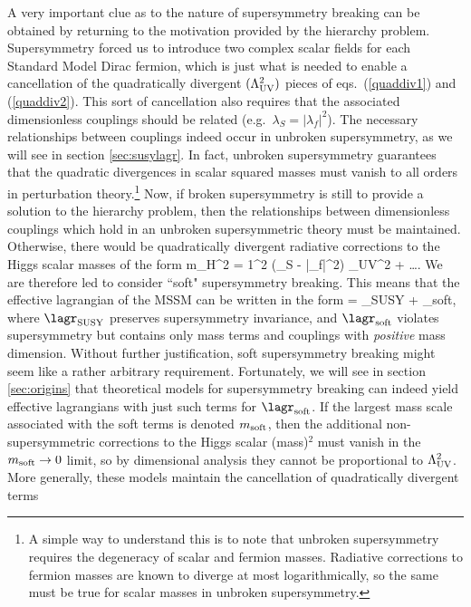 A very important clue as to the nature of supersymmetry breaking
can be obtained by returning to the motivation provided by
the hierarchy problem.
Supersymmetry forced us to introduce two complex scalar fields for
each Standard Model Dirac fermion, which is just what is needed to enable
a cancellation of the quadratically divergent $(\Lambda_{\rm UV}^2)$
pieces of eqs.~(\ref{quaddiv1}) and (\ref{quaddiv2}). This sort of
cancellation also requires that the associated dimensionless couplings
should be related (e.g.~$\lambda_S = |\lambda_f|^2$). The
necessary
relationships between couplings indeed occur
in unbroken supersymmetry, as we will see in section \ref{sec:susylagr}.
In fact, unbroken supersymmetry guarantees that the quadratic divergences
in
scalar squared masses must vanish to all orders in perturbation
theory.\footnote{A simple way to understand this is to note
that unbroken supersymmetry
requires
the degeneracy of scalar and fermion masses. Radiative corrections to
fermion masses are known to diverge at most logarithmically, so the same
must be true for scalar masses in unbroken supersymmetry.}
Now, if broken supersymmetry
is still to provide a solution to the hierarchy problem,
then the relationships between dimensionless couplings which
hold in an unbroken supersymmetric theory must
be maintained.
Otherwise, there would be quadratically divergent radiative corrections
to the Higgs scalar masses of the form
\beq
\Delta m_H^2 = {1\pi^2} (\lambda_S - |\lambda_f|^2)
\Lambda_{\rm UV}^2 + \ldots .
\eeq
We are therefore led to consider ``soft" supersymmetry breaking.
This means that the effective
lagrangian of the MSSM can be written
in the form
\beq
\lagr = \lagr_{\rm SUSY} + \lagr_{\rm soft},
\eeq
where $\lagr_{\rm SUSY}$ preserves supersymmetry invariance,
and $\lagr_{\rm soft}$ violates supersymmetry but contains only mass terms
and couplings with {\it positive} mass dimension.
Without further justification, soft supersymmetry breaking might
seem like a rather arbitrary requirement.
Fortunately, we will see in section \ref{sec:origins} that theoretical
models for
supersymmetry breaking
can indeed yield
effective lagrangians with
just such terms for $\lagr_{\rm soft}$.
If the largest mass scale
associated with the soft terms is
denoted $m_{\rm soft}$, then the additional
non-supersymmetric corrections to the Higgs scalar (mass)$^2$
must vanish in the $m_{\rm soft}\rightarrow 0$ limit, so by dimensional
analysis they cannot be proportional to $\Lambda_{\rm UV}^2$.
More generally, these models
maintain the cancellation of quadratically divergent terms
